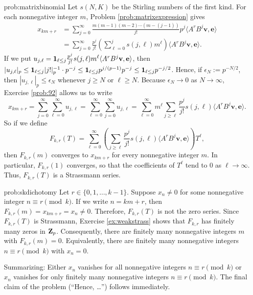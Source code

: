\begin{sol}{prob:matrixbinomial} Let $s(N,K)$ be the Stirling numbers of the first kind. For each nonnegative integer $m$, Problem \ref{prob:matrixexpression} gives
\begin{align*} x_{km+r} &= \sum_{j=0}^{\infty} \frac{m(m-1)(m-2)\cdots(m-(j-1))}{j!} p^j \langle A^r B^j\textbf{v}, \textbf{e}\rangle  \\
&= \sum_{j=0}^{\infty} \frac{p^j}{j!}\left(\sum_{\ell=0}^{j} s(j,\ell)m^\ell\right) \langle A^r B^j\textbf{v},\textbf{e}\rangle.\end{align*}
If we put $u_{j,\ell} = \mathbf{1}_{\ell \le j}\frac{p^j}{j!}s(j,\ell)m^{\ell}\langle A^r B^j\textbf{v},\textbf{e}\rangle$, then $|u_{j,\ell}|_p \le \mathbf{1}_{\ell \le j} |j!|_{p}^{-1} \cdot p^{-j} \le \mathbf{1}_{\ell \le j} p^{j/(p-1)} p^{-j} \le \mathbf{1}_{\ell \le j} p^{-j/2}$.  Hence, if $\epsilon_N:= p^{-N/2}$, then $|u_{j,\ell}|_p \le \epsilon_N$ whenever $j\ge N$ or $\ell \ge N$. Because $\epsilon_N\to 0$ as $N\to\infty$, Exercise \ref{prob:92} allows us to write
\[ x_{km+r} = \sum_{j=0}^{\infty} \sum_{\ell=0}^{\infty} u_{j,\ell} = \sum_{\ell=0}^{\infty} \sum_{j=0}^{\infty} u_{j,\ell} = \sum_{\ell=0}^{\infty} m^\ell \sum_{j\ge \ell} \frac{p^j}{j!} s(j,\ell) \langle A^r B^j \textbf{v},\textbf{e}\rangle. \]
So if we define
\[ F_{k,r}(T) = \sum_{\ell=0}^{\infty} \left(\sum_{j\ge \ell} \frac{p^j}{j!} s(j,\ell) \langle A^r B^j \textbf{v},\textbf{e}\rangle\right) T^\ell,\]
then $F_{k,r}(m)$ converges to $x_{km+r}$ for every nonnegative integer $m$. In particular, $F_{k,r}(1)$ converges, so that the coefficients of $T^\ell$ tend to $0$ as $\ell\to\infty$. Thus, $F_{k,r}(T)$ is a Strassmann series.
\end{sol}
\begin{sol}{prob:skdichotomy} Let $r \in \{0,1,\dots,k-1\}$. Suppose $x_{n}\ne 0$ for some nonnegative integer $n\equiv r\pmod{k}$. If we write $n=km+r$, then $F_{k,r}(m) = x_{km+r} = x_{n} \ne 0$. Therefore, $F_{k,r}(T)$ is not the zero series. Since $F_{k,r}(T)$ is Strassmann, Exercise \ref{ex:weakstrass} shows that $F_{k,r}$ has finitely many zeros in $\mathbf{Z}_p$. Consequently, there are finitely many nonnegative integers $m$ with $F_{k,r}(m) = 0$. Equivalently, there are finitely many nonnegative integers $n\equiv r\pmod{k}$ with $x_n=0$. 

Summarizing: Either $x_n$ vanishes for all nonnegative integers $n\equiv r\pmod{k}$ or $x_n$ vanishes for only finitely many nonnegative integers $n\equiv r\pmod{k}$. The final claim of the problem (``Hence, \dots'') follows immediately.
\end{sol}

